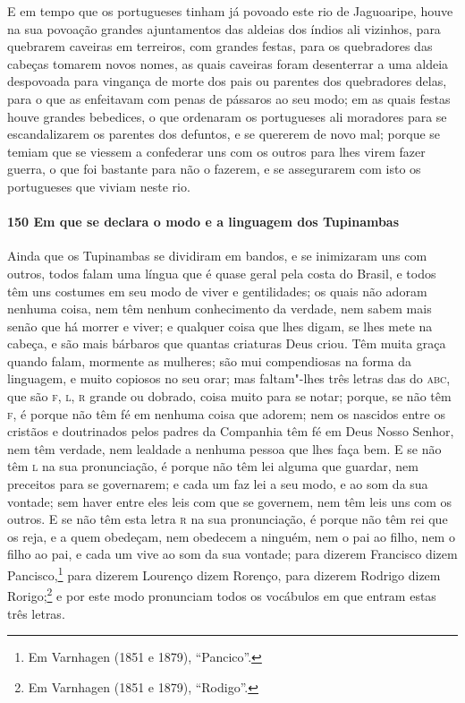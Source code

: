 E em tempo que os portugueses tinham já povoado este rio de Jaguoaripe, houve na sua
povoação grandes ajuntamentos das aldeias dos índios ali vizinhos, para quebrarem caveiras
em terreiros, com grandes festas, para os quebradores das cabeças tomarem novos nomes, as
quais caveiras foram desenterrar a uma aldeia despovoada para vingança de morte dos pais
ou parentes dos quebradores delas, para o que as enfeitavam com penas de pássaros ao seu
modo; em as quais festas houve grandes bebedices, o que ordenaram os portugueses ali
moradores para se escandalizarem os parentes dos defuntos, e se quererem de novo mal;
porque se temiam que se viessem a confederar uns com os outros para lhes virem fazer
guerra, o que foi bastante para não o fazerem, e se assegurarem com isto os portugueses
que viviam neste rio.

\paragraph{150 Em que se declara o modo e a linguagem dos Tupinambas}

Ainda que os Tupinambas se dividiram em bandos, e se inimizaram uns com outros, todos
falam uma língua que é quase geral pela costa do Brasil, e todos têm uns costumes em seu
modo de viver e gentilidades; os quais não adoram nenhuma coisa, nem têm nenhum
conhecimento da verdade, nem sabem mais senão que há morrer e viver; e qualquer coisa que
lhes digam, se lhes mete na cabeça, e são mais bárbaros que quantas criaturas Deus criou.
Têm muita graça quando falam, mormente as mulheres; são mui compendiosas na forma da
linguagem, e muito copiosos no seu orar; mas faltam"-lhes três letras das do \textsc{abc},
que são \textsc{f, l, r} grande ou dobrado, coisa muito para se notar; porque, se não têm
\textsc{f}, é porque não têm fé em nenhuma coisa que adorem; nem os nascidos entre os
cristãos e doutrinados pelos padres da Companhia têm fé em Deus Nosso Senhor, nem têm
verdade, nem lealdade a nenhuma pessoa que lhes faça bem. E se não têm \textsc{l} na sua
pronunciação, é porque não têm lei alguma que guardar, nem preceitos para se governarem; e
cada um faz lei a seu modo, e ao som da sua vontade; sem haver entre eles leis com que se
governem, nem têm leis uns com os outros. E se não têm esta letra \textsc{r} na sua
pronunciação, é porque não têm rei que os reja, e a quem obedeçam, nem obedecem a ninguém,
nem o pai ao filho, nem o filho ao pai, e cada um vive ao som da sua vontade; para dizerem
Francisco dizem Pancisco,\footnote{ Em Varnhagen (1851 e 1879), ``Pancico''.} para dizerem
Lourenço dizem Rorenço, para dizerem Rodrigo dizem Rorigo;\footnote{ Em Varnhagen (1851 e
1879), ``Rodigo''.} e por este modo pronunciam todos os vocábulos em que entram estas
três letras.

